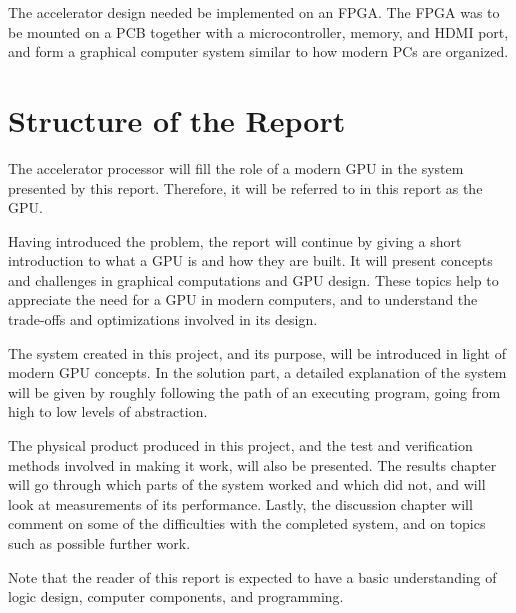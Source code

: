 \documentclass[../main/report.tex]{subfiles}
\begin{document}
The accelerator design needed be implemented on an FPGA.
The FPGA was to be mounted on a PCB together with a microcontroller, memory, and HDMI port, and form a graphical computer system similar to how modern PCs are organized.


\section{Structure of the Report}

The accelerator processor will fill the role of a modern GPU in the system presented by this report.
Therefore, it will be referred to in this report as the GPU.

Having introduced the problem, the report will continue by giving a short introduction to what a GPU is and how they are built.
It will present concepts and challenges in graphical computations and GPU design.
These topics help to appreciate the need for a GPU in modern computers, and to understand the trade-offs and optimizations involved in its design.

The system created in this project, and its purpose, will be introduced in light of modern GPU concepts.
In the solution part, a detailed explanation of the system will be given by roughly following the path of an executing program, going from high to low levels of abstraction.

The physical product produced in this project, and the test and verification methods involved in making it work, will also be presented.
The results chapter will go through which parts of the system worked and which did not, and will look at measurements of its performance.
Lastly, the discussion chapter will comment on some of the difficulties with the completed system, and on topics such as possible further work.

Note that the reader of this report is expected to have a basic understanding of logic design, computer components, and programming.
\end{document}
